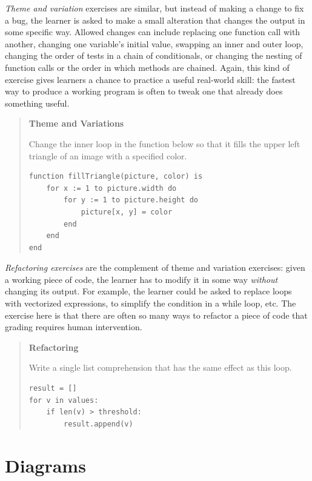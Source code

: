 \emph{Theme and variation} exercises are similar, but instead of making a
change to fix a bug, the learner is asked to make a small alteration
that changes the output in some specific way. Allowed changes can
include replacing one function call with another, changing one
variable's initial value, swapping an inner and outer loop, changing
the order of tests in a chain of conditionals, or changing the nesting
of function calls or the order in which methods are chained. Again, this
kind of exercise gives learners a chance to practice a useful real-world
skill: the fastest way to produce a working program is often to tweak
one that already does something useful.

\begin{quote}\setlength{\parindent}{0pt}
\textbf{Theme and Variations}

Change the inner loop in the function below so that it fills the upper
left triangle of an image with a specified color.

\begin{verbatim}
function fillTriangle(picture, color) is
    for x := 1 to picture.width do
        for y := 1 to picture.height do
            picture[x, y] = color
        end
    end
end
\end{verbatim}
\end{quote}

\emph{Refactoring exercises} are the complement of theme and variation
exercises: given a working piece of code, the learner has to modify it
in some way \emph{without} changing its output. For example, the learner
could be asked to replace loops with vectorized expressions, to simplify
the condition in a while loop, etc. The exercise here is that there are
often so many ways to refactor a piece of code that grading requires
human intervention.

\begin{quote}\setlength{\parindent}{0pt}
\textbf{Refactoring}

Write a single list comprehension that has the same effect as this
loop.

\begin{verbatim}
result = []
for v in values:
    if len(v) > threshold:
        result.append(v)
\end{verbatim}
\end{quote}

\section{Diagrams}\label{s:exercises-diagrams}

